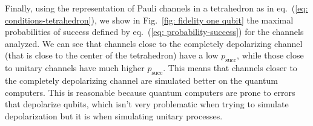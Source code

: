 \documentclass[10pt,letterpaper]{article} %
\renewcommand{\succ}{\textrm{succ}}
\newcommand{\fref}[1]{Fig.~\ref{#1}}
\newcommand{\eref}[1]{eq.~(\ref{#1})}
\begin{document}
Finally, using the representation of Pauli channels in a tetrahedron as
in \eref{eq: conditions-tetrahedron},
we show in \fref{fig: fidelity one qubit} the maximal probabilities of
success defined by \eref{eq: probability-success} for the channels
analyzed. 
We can see that channels close to the 
completely depolarizing
channel (that is close to the center of the tetrahedron)
have a low $p_{\succ}$, while those 
close to unitary channels have much higher $p_{\succ}$.
This means that channels closer to the 
completely depolarizing channel are simulated better on the quantum computers.
This is reasonable because quantum computers are prone to errors
that depolarize qubits, which isn't very problematic
when trying to simulate depolarization but it is 
when simulating unitary processes.

\end{document}
